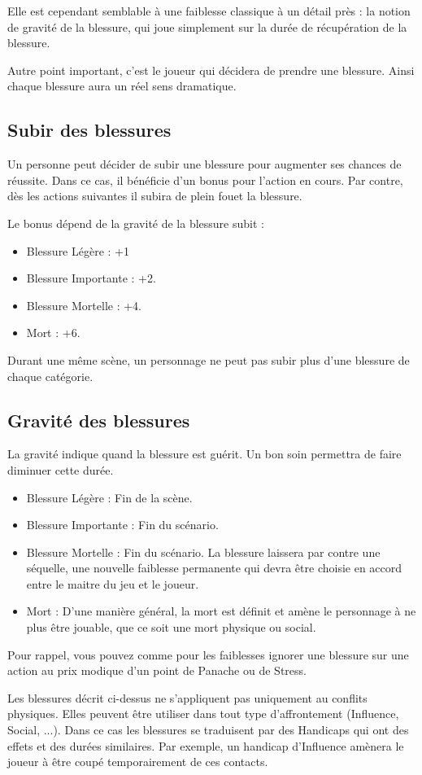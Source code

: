 \begin{multicols}{2}
Elle est cependant semblable à une faiblesse classique à un détail près : la notion de gravité de la blessure, qui joue simplement sur la durée de récupération de la blessure.

Autre point important, c'est le joueur qui décidera de prendre une blessure. Ainsi chaque blessure aura un réel sens dramatique.

\subsection{Subir des blessures}

Un personne peut décider de subir une blessure pour augmenter ses chances de réussite. Dans ce cas, il bénéficie d'un bonus pour l'action en cours. Par contre, dès les actions suivantes il subira de plein fouet la blessure.

Le bonus dépend de la gravité de la blessure subit :
\begin{itemize}
\item Blessure Légère : +1
\item Blessure Importante : +2.
\item Blessure Mortelle : +4.
\item Mort : +6.
\end{itemize}

Durant une même scène, un personnage ne peut pas subir plus d'une blessure de chaque catégorie.

\subsection{Gravité des blessures}

La gravité indique quand la blessure est guérit. Un bon soin permettra de faire diminuer cette durée.

\begin{itemize}
\item Blessure Légère : Fin de la scène.
\item Blessure Importante : Fin du scénario.
\item Blessure Mortelle : Fin du scénario. La blessure laissera par contre une séquelle, une nouvelle faiblesse permanente qui devra être choisie en accord entre le maitre du jeu et le joueur.
\item Mort : D'une manière général, la mort est définit et amène le personnage à ne plus être jouable, que ce soit une mort physique ou social. 
\end{itemize}

Pour rappel, vous pouvez comme pour les faiblesses ignorer une blessure sur une action au prix modique d'un point de Panache ou de Stress.

Les blessures décrit ci-dessus ne s'appliquent pas uniquement au conflits physiques. Elles peuvent être utiliser dans tout type d'affrontement (Influence, Social, ...). Dans ce cas les blessures se traduisent par des Handicaps qui ont des effets et des durées similaires. Par exemple, un handicap d'Influence amènera le joueur à être coupé temporairement de ces contacts.

\end{multicols}

